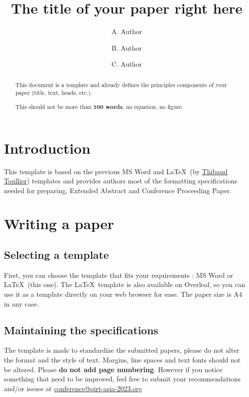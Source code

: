 \documentclass[license]{qirtconference}
\title{The title of your paper right here}
\author{A. Author}     %
\author[*]{B. Author}  %
\author[**]{C. Author} %
\affiliation{Institute, Laboratory, Team, City, Country}
\affiliation[**]{Institute, Laboratory, Team, City, Country}
\begin{document}
\maketitle 

\begin{abstract}
This document is a template and already defines the principles components of your paper (title, text, heads, etc.).

This should not be more than \textbf{100 words}, no equation, no figure.
\end{abstract}

\section{Introduction}
This template is based on the previous MS Word and \LaTeX\  (by \href{mailto:thibaud.toullier@univ-eiffel.fr}{Thibaud Toullier}) templates and provides authors most of the formatting specifications needed for preparing, Extended Abstract and Conference Proceeding Paper.

\section{Writing a paper}

\subsection{Selecting a template}

First, you can choose the template that fits your requirements : MS Word or \LaTeX\ (this one). The \LaTeX\ template is also available on Overleaf, so you can use it as a template directly on your web browser for ease.
The paper size is A4 in any case.

\subsection{Maintaining the specifications}

The template is made to standardize the submitted papers, please do not alter the format and the style of text. Margins, line spaces and text fonts should not be altered. Please \textbf{do not add page numbering}.
However if you notice something that need to be improved, feel free to submit your recommendations and/or issues at \href{mailto:conference@qirt-asia-2023.org}{conference@qirt-asia-2023.org}
\end{document}
